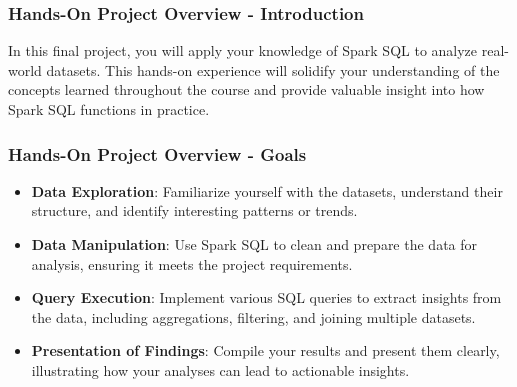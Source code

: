 \documentclass[aspectratio=169]{beamer}
\begin{document}
\begin{frame}[fragile]
    \frametitle{Hands-On Project Overview - Introduction}
    In this final project, you will apply your knowledge of Spark SQL to analyze real-world datasets. 
    This hands-on experience will solidify your understanding of the concepts learned throughout the course 
    and provide valuable insight into how Spark SQL functions in practice.
\end{frame}

\begin{frame}[fragile]
    \frametitle{Hands-On Project Overview - Goals}
    \begin{itemize}
        \item \textbf{Data Exploration}: Familiarize yourself with the datasets, understand their structure, and identify interesting patterns or trends.
        \item \textbf{Data Manipulation}: Use Spark SQL to clean and prepare the data for analysis, ensuring it meets the project requirements.
        \item \textbf{Query Execution}: Implement various SQL queries to extract insights from the data, including aggregations, filtering, and joining multiple datasets.
        \item \textbf{Presentation of Findings}: Compile your results and present them clearly, illustrating how your analyses can lead to actionable insights.
    \end{itemize}
\end{frame}
\end{document}

